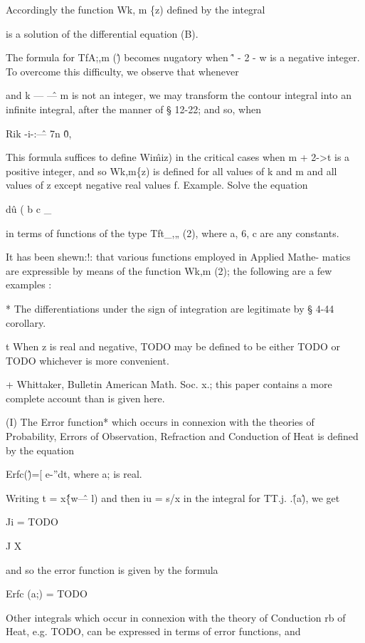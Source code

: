 Accordingly the function Wk, m \{z) defined by the integral

is a solution of the differential equation (B).

The formula for TfA;,m (\^) becomes nugatory when \^' - 2 - w is a
negative integer. To overcome this difficulty, we observe that
whenever

and k — \^— m is not an integer, we may transform the contour integral
into an infinite integral, after the manner of § 12-22; and so, when

Rik -i-:\^— 7n \^0,

This formula suffices to define Wi\^miz) in the critical cases when m
+ 2->t is a positive integer, and so Wk,m\{z) is defined for all
values of k and m and all values of z except negative real values f.
Example. Solve the equation

d\^u ( b c \_

in terms of functions of the type Tft\_,„ (2), where a, 6, c are any
constants.


It has been shewn:!: that various functions employed in Applied Mathe-
matics are expressible by means of the function Wk,m (2); the
following are a few examples :

* The differentiations under the sign of integration are legitimate by
§ 4-44 corollary.

t When z is real and negative, TODO may be defined to be either TODO
or TODO whichever is more convenient.

+ Whittaker, Bulletin American Math. Soc. x.; this paper contains a
more complete account than is given here.

%
%
(I) The Error function* which occurs in connexion with the theories of
Probability, Errors of Observation, Refraction and Conduction of Heat
is defined by the equation

Erfc(\^)=[ e-''dt, where a; is real.

Writing t = x\^\{w\^ — l) and then iu = s/x in the integral for TT.j.
.\^(a\^), we get

Ji = TODO

J X

and so the error function is given by the formula

Erfc (a;) = TODO

Other integrals which occur in connexion with the theory of Conduction
rb of Heat, e.g. TODO, can be expressed in terms of error functions,
and

